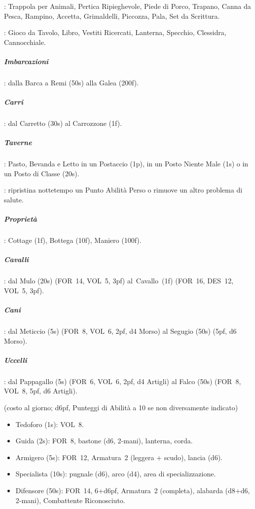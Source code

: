 \documentclass[itdr]{subfiles}
\begin{document}
: Trappola per Animali, Pertica Ripieghevole, Piede di Porco, Trapano, Canna da Pesca, Rampino, Accetta, Grimaldelli, Piccozza, Pala, Set da Scrittura.

: Gioco da Tavolo, Libro, Vestiti Ricercati, Lanterna, Specchio, Clessidra, Cannocchiale.

\vfill

\subparagraph{Imbarcazioni}: dalla Barca a Remi (50s) alla Galea (200f).

\subparagraph{Carri}: dal Carretto (30s) al Carrozzone (1f).

\subparagraph{Taverne}: Pasto, Bevanda e Letto in un Postaccio (1p), in un Posto Niente Male (1s) o in un Posto di Classe (20s).

: ripristina nottetempo un Punto Abilità Perso o rimuove un altro problema di salute.

\subparagraph{Proprietà}: Cottage (1f), Bottega (10f), Maniero (100f).

\subparagraph{Cavalli}: dal Mulo (20s) (FOR~14, VOL~5, 3pf) al~Cavallo~(1f) (FOR~16, DES~12, VOL~5, 3pf).

\subparagraph{Cani}: dal Meticcio (5s) (FOR~8, VOL~6, 2pf, d4 Morso) al Segugio (50s) (5pf, d6 Morso).

\subparagraph{Uccelli}: dal Pappagallo (5s) (FOR~6, VOL~6, 2pf, d4 Artigli) al Falco (50s) (FOR~8, VOL~8, 5pf, d6 Artigli).

\vfill

 (costo al giorno; d6pf, Punteggi di Abilità a 10
se non diversamente indicato)

\begin{itemize}
	\item Tedoforo (1s): VOL~8.
	\item Guida (2s): FOR~8, bastone (d6, 2-mani), lanterna, corda.
	\item Armigero (5s): FOR~12, Armatura~2 (leggera + scudo), lancia (d6).
	\item Specialista (10s): pugnale (d6), arco (d4), area di specializzazione.
	\item Difensore (50s): FOR~14, 6+d6pf, Armatura~2 (completa), alabarda (d8+d6, 2-mani), Combattente Riconosciuto.
\end{itemize}


\end{document}
